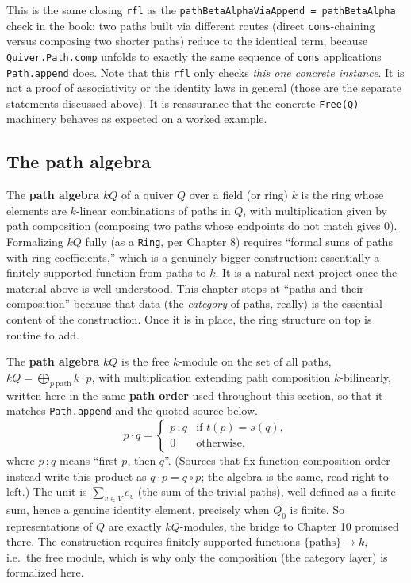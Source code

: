 This is the same closing \texttt{rfl} as the \texttt{pathBetaAlphaViaAppend = pathBetaAlpha} check in the book: two paths built via different routes (direct \texttt{cons}-chaining versus composing two shorter paths) reduce to the identical term, because \texttt{Quiver.Path.comp} unfolds to exactly the same sequence of \texttt{cons} applications \texttt{Path.append} does. Note that this \texttt{rfl} only checks \emph{this one concrete instance}. It is not a proof of associativity or the identity laws in general (those are the separate statements discussed above). It is reassurance that the concrete \texttt{Free(Q)} machinery behaves as expected on a worked example.

\subsection{The path algebra}\label{sec:11-path-algebras:05-path-composition:3}

The \textbf{path algebra} \(kQ\) of a quiver \(Q\) over a field (or ring) \(k\) is the ring whose elements are \(k\)-linear combinations of paths in \(Q\), with multiplication given by path composition (composing two paths whose endpoints do not match gives \(0\)). Formalizing \(kQ\) fully (as a \texttt{Ring}, per Chapter 8) requires ``formal sums of paths with ring coefficients,'' which is a genuinely bigger construction: essentially a finitely-supported function from paths to \(k\). It is a natural next project once the material above is well understood. This chapter stops at ``paths and their composition'' because that data (the \emph{category} of paths, really) is the essential content of the construction. Once it is in place, the ring structure on top is routine to add.

\begin{mathreading}

The \textbf{path algebra} \(kQ\) is the free \(k\)-module on the set of all paths, \(kQ = \bigoplus_{p\ \text{path}} k\cdot p\), with multiplication extending path composition \(k\)-bilinearly, written here in the same \textbf{path order} used throughout this section, so that it matches \texttt{Path.append} and the quoted source below. \[
p \cdot q = \begin{cases} p\,;q & \text{if } t(p) = s(q),\\ 0 &
\text{otherwise,}\end{cases}
\] where \(p\,;q\) means ``first \(p\), then \(q\)''. (Sources that fix function-composition order instead write this product as \(q \cdot p = q \circ p\); the algebra is the same, read right-to-left.) The unit is \(\sum_{v\in V} e_v\) (the sum of the trivial paths), well-defined as a finite sum, hence a genuine identity element, precisely when \(Q_0\) is finite. So representations of \(Q\) are exactly \(kQ\)-modules, the bridge to Chapter 10 promised there. The construction requires finitely-supported functions \(\{\text{paths}\} \to k\), i.e.~the free module, which is why only the composition (the category layer) is formalized here.

\end{mathreading}

